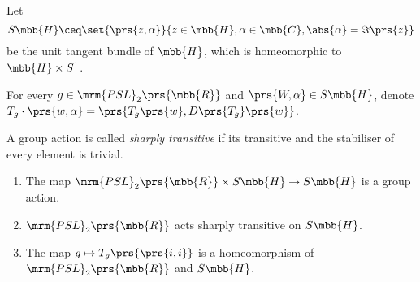 \documentclass[10pt, twoside]{book}
\begin{document}
\begin{definition}
Let
\[S\mbb{H} \ceq \set{\prs{z,\alpha}}{z \in \mbb{H}, \alpha \in \mbb{C}, \abs{\alpha} = \Im\prs{z}}\]
be the unit tangent bundle of $\mbb{H}$, which is homeomorphic to $\mbb{H} \times S^1$.
\end{definition}

\begin{definition}
For every $g \in \mrm{PSL}_2\prs{\mbb{R}}$ and $\prs{W,\alpha} \in S \mbb{H}$, denote $T_g \cdot \prs{w, \alpha} = \prs{T_g\prs{w}, D\prs{T_g}\prs{w}}$.
\end{definition}

\begin{definition}
A group action is called \emph{sharply transitive} if its transitive and the stabiliser of every element is trivial.
\end{definition}

\begin{lemma}
\begin{enumerate}
\item The map $\mrm{PSL}_2\prs{\mbb{R}} \times S\mbb{H} \to S\mbb{H}$ is a group action.
\item $\mrm{PSL}_2\prs{\mbb{R}}$ acts sharply transitive on $S\mbb{H}$.
\item The map $g \mapsto T_g\prs{\prs{i,i}}$ is a homeomorphism of $\mrm{PSL}_2\prs{\mbb{R}}$ and $S\mbb{H}$.
\end{enumerate}
\end{lemma}
\end{document}
